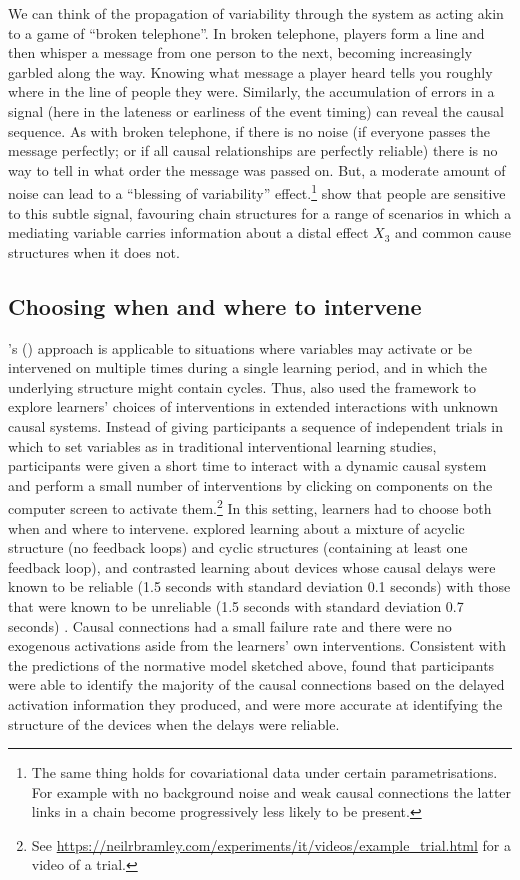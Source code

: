 \documentclass{cambridge7A}%
\def\citeapos#1{\citeauthor{#1}'s (\citeyear{#1})}
\begin{document}
We can think of the propagation of variability through the system as acting akin to a game of ``broken telephone''.  In broken telephone, players form a line and then whisper a message from one person to the next, becoming increasingly garbled along the way.  Knowing what message a player heard tells you roughly where in the line of people they were.  Similarly, the accumulation of errors in a signal (here in the lateness or earliness of the event timing) can reveal the causal sequence.  As with broken telephone, if there is no noise (if everyone passes the message perfectly; or if all causal relationships are perfectly reliable) there is no way to tell in what order the message was passed on. But, a moderate amount of noise can lead to a ``blessing of variability'' effect.\footnote{The same thing holds for covariational data under certain parametrisations.  For example with no background noise and weak causal connections the latter links in a chain become progressively less likely to be present.}   \cite{bramley2018time} show that people are sensitive to this subtle signal, favouring chain structures for a range of scenarios in which a mediating variable carries information about a distal effect $X_3$ and common cause structures when it does not.  

\subsection{Choosing when and where to intervene}

\citeapos{bramley2018time} approach is applicable to situations where variables may activate or be intervened on multiple times during a single learning period, and in which the underlying structure might contain cycles.  Thus, \cite{bramley2017dynamic} also used the framework to explore learners' choices of interventions in extended interactions with unknown causal systems.  Instead of giving participants a sequence of independent trials in which to set variables as in traditional interventional learning studies, participants were given a short time to interact with a dynamic causal system and perform a small number of interventions by clicking on components on the computer screen to activate them.\footnote{See \url{https://neilrbramley.com/experiments/it/videos/example\_trial.html} for a video of a trial.}   In this setting, learners had to choose both when and where to intervene.  \cite{bramley2017dynamic} explored learning about a mixture of acyclic structure (no feedback loops) and cyclic structures (containing at least one feedback loop), and contrasted learning about devices whose causal delays were known to be reliable (1.5 seconds with standard deviation 0.1 seconds) with those that were known to be unreliable (1.5 seconds with standard deviation 0.7 seconds) .  Causal connections had a small failure rate and there were no exogenous activations aside from the learners' own interventions.  Consistent with the predictions of the normative model sketched above, \cite{bramley2017dynamic} found that participants were able to identify the majority of the causal connections based on the delayed activation information they produced, and were more accurate at identifying the structure of the devices when the delays were reliable. 
\end{document}
